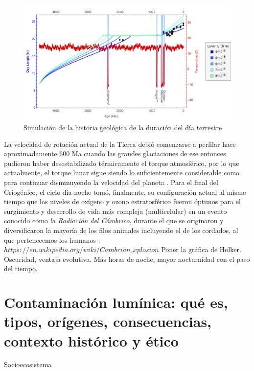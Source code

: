 \begin{figure}
  \centering
    \includegraphics[width=1\textwidth]{duraciondeldiahistorico}
  \caption{Simulación de la historia geológica de la duración del día terrestre \citep{Stevenson&Bartlett2016}}
  \label{duraciondia}
\end{figure}

La velocidad de rotación actual de la Tierra debió comenzarse a perfilar hace aproximadamente 600 Ma cuando las grandes glaciaciones de ese entonces pudieron haber desestabilizado térmicamente el torque atmosférico, por lo que actualmente, el torque lunar sigue siendo lo suficientemente considerable como para continuar disminuyendo la velocidad del planeta \citep{Stevenson&Bartlett2016}. Para el final del Criogénico, el ciclo día-noche tomó, finalmente, su configuración actual al mismo tiempo que los niveles de oxígeno y ozono estratosférico fueron óptimos para el surgimiento y desarrollo de vida más compleja (multicelular) en un evento conocido como \textit{la Radiación del Cámbrico}, durante el que se originaron y diversificaron la mayoría de los filos animales incluyendo el de los cordados, al que pertenecemos los humanos .\\

$https://en.wikipedia.org/wiki/Cambrian_explosion$	
Poner la gráfica de Holker. Oscuridad, ventaja evolutiva. Más horas de noche, mayor nocturnidad con el paso del tiempo.\\

\section{Contaminación lumínica: qué es, tipos, orígenes, consecuencias, contexto histórico y ético}

Socioecosistema\\

